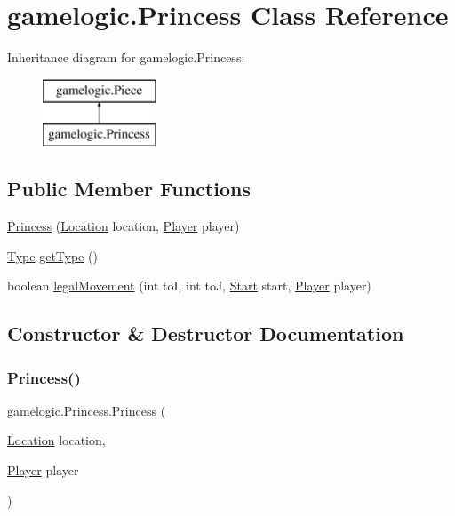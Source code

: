 \hypertarget{classgamelogic_1_1_princess}{}\section{gamelogic.\+Princess Class Reference}
\label{classgamelogic_1_1_princess}
Inheritance diagram for gamelogic.\+Princess\+:\begin{figure}[H]
\begin{center}
\leavevmode
\includegraphics[height=2.000000cm]{classgamelogic_1_1_princess}
\end{center}
\end{figure}
\subsection*{Public Member Functions}
\begin{DoxyCompactItemize}
\item 
\mbox{\hyperlink{classgamelogic_1_1_princess_ac88224f446cffc47d38047cca0a8e6eb}{Princess}} (\mbox{\hyperlink{classgamelogic_1_1_location}{Location}} location, \mbox{\hyperlink{classgamelogic_1_1_player}{Player}} player)
\item 
\mbox{\hyperlink{enumgamelogic_1_1_type}{Type}} \mbox{\hyperlink{classgamelogic_1_1_princess_ad0792f772afda96bdc167331fdf139c5}{get\+Type}} ()
\item 
boolean \mbox{\hyperlink{classgamelogic_1_1_princess_a561f424db16e87b085990392ec151db4}{legal\+Movement}} (int toI, int toJ, \mbox{\hyperlink{classgamelogic_1_1_start}{Start}} start, \mbox{\hyperlink{classgamelogic_1_1_player}{Player}} player)
\end{DoxyCompactItemize}


\subsection{Constructor \& Destructor Documentation}
\mbox{\label{classgamelogic_1_1_princess_ac88224f446cffc47d38047cca0a8e6eb}} 
\subsubsection{\texorpdfstring{Princess()}{Princess()}}
{\footnotesize\ttfamily gamelogic.\+Princess.\+Princess (\begin{DoxyParamCaption}\item[{\mbox{\hyperlink{classgamelogic_1_1_location}{Location}}}]{location,  }\item[{\mbox{\hyperlink{classgamelogic_1_1_player}{Player}}}]{player }\end{DoxyParamCaption})}

